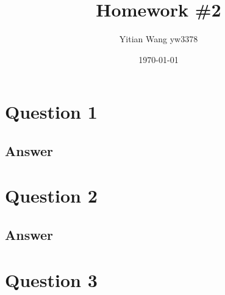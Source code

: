 \documentclass[
	12pt, %
]{fphw}
\title{Homework \#2} %
\author{Yitian Wang yw3378} %
\date{\today} %
\institute{Columbia University} %
\begin{document}
\maketitle %


\section*{Question 1}

\begin{problem}

\end{problem}


\subsection*{Answer}




\section*{Question 2}

\begin{problem}

\end{problem}


\subsection*{Answer}




\section*{Question 3}

\begin{problem}

\end{problem}
\end{document}

